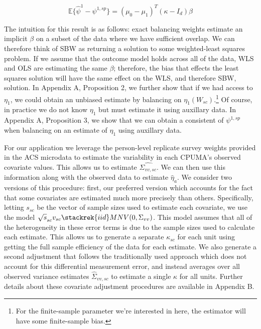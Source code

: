 \documentclass[aoas]{imsart}
\theoremstyle{plain}
\theoremstyle{remark}
\begin{document}
\begin{equation}
\mathbb{E}\{\hat{\psi}^{1} - \psi^{1, sp}\} = (\mu_0 - \mu_1)^T(\kappa - I_d)\beta
\end{equation}

The intuition for this result is as follows: exact balancing weights estimate an implicit $\beta$ on a subset of the data where we have sufficient overlap. We can therefore think of SBW as returning a solution to some weighted-least squares problem. If we assume that the outcome model holds across all of the data, WLS and OLS are estimating the same $\beta$; therefore, the bias that effects the least squares solution will have the same effect on the WLS, and therefore SBW, solution. In Appendix A, Proposition 2, we further show that if we had access to $\eta_1$, we could obtain an unbiased estimate by balancing on $\eta_1(W_{sc})$.\footnote{For the finite-sample parameter we're interested in here, the estimator will have some finite-sample bias.} Of course, in practice we do not know $\eta_1$ but must estimate it using auxillary data. In Appendix A, Proposition 3, we show that we can obtain a consistent of $\psi^{1, sp}$ when balancing on an estimate of $\eta_1$ using auxillary data. 

For our application we leverage the person-level replicate survey weights provided in the ACS microdata to estimate the variability in each CPUMA's observed covariate values. This allows us to estimate $\hat{\Sigma_{vv, sc}}$. We can then use this information along with the observed data to estimate $\hat{\eta}_a$. We consider two versions of this procedure: first, our preferred version which accounts for the fact that some covariates are estimated much more precisely than others. Specifically, letting $s_{sc}$ be the vector of sample sizes used to estimate each covariate, we use the model $\sqrt{s}_{sc}v_{sc} \stackrek{iid}MNV(0, \Sigma_{vv})$. This model assumes that all of the heterogeneity in these error terms is due to the sample sizes used to calculate each estimate. This allows us to generate a separate $\kappa_{sc}$ for each unit using getting the full sample efficiency of the data for each estimate. We also generate a second adjustment that follows the traditionally used approach which does not account for this differential measurement error, and instead averages over all observed variance estimates $\hat{\Sigma}_{vv, sc}$ to estimate a single $\kappa$ for all units. Further details about these covariate adjustment procedures are available in Appendix B.
\end{document}

